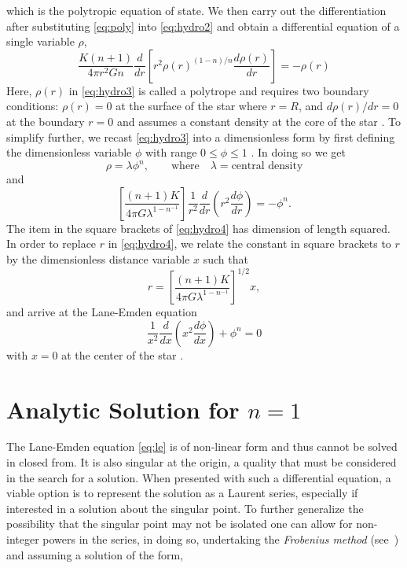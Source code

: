 \documentclass[12pt, manuscript]{article}
\begin{document}
        which is the polytropic equation of state. We then carry out the differentiation after substituting \eqref{eq:poly} into \eqref{eq:hydro2} and obtain a differential equation of a single variable $\rho$,
        \begin{equation}\label{eq:hydro3}
            \frac{K(n+1)}{4\pi r^2Gn}\frac{d}{dr}\left[r^2\rho(r)^{(1-n)/n}\frac{d\rho(r)}{dr}\right] = -\rho(r)
        \end{equation}
        Here, $\rho(r)$ in \eqref{eq:hydro3} is called a polytrope and requires two boundary conditions: $\rho(r) = 0$ at the surface of the star where $r = R$, and $d\rho(r)/dr = 0$ at the boundary $r = 0$ and assumes a constant density at the core of the star \cite{dina}. To simplify further, we recast \eqref{eq:hydro3} into a dimensionless form by first defining the dimensionless variable $\phi$ with range $0 \leq \phi \leq 1$ \cite{lea} \cite{dina}. In doing so we get
        \begin{equation}\label{eq:theta} 
            \rho = \lambda\phi^n, \qquad \text{where} \quad \lambda = \text{central density}
        \end{equation}
         and
        \begin{equation}\label{eq:hydro4}
            \left[\frac{(n+1)K}{4\pi G\lambda^{1-n^{-1}}}\right]\frac{1}{r^2}\frac{d}{dr}\left(r^2\frac{d\phi}{dr}\right) = -\phi^n.
        \end{equation}
        The item in the square brackets of \eqref{eq:hydro4} has dimension of length squared. In order to replace $r$ in \eqref{eq:hydro4}, we relate the constant in square brackets to $r$ by the dimensionless distance variable $x$ such that
        \begin{equation}\label{eq:x}
            r = \left[\frac{(n+1)K}{4\pi G\lambda^{1-n^{-1}}}\right]^{1/2}x,
        \end{equation}
        and arrive at the Lane-Emden equation 
        \begin{equation}\label{eq:le}
            \frac{1}{x^2}\frac{d}{dx}\left(x^2\frac{d\phi}{dx}\right) +\phi^n = 0
        \end{equation}
        with $x = 0$ at the center of the star \cite{lea}.

\section*{Analytic Solution for $n = 1$}
The Lane-Emden equation \eqref{eq:le} is of non-linear form and thus cannot be solved in closed from. It is also singular at the origin, a quality that must be considered in the search for a solution. When presented with such a differential equation, a viable option is to represent the solution as a Laurent series, especially if interested in a solution about the singular point. To further generalize the possibility that the singular point may not be isolated one can allow for non-integer powers in the series, in doing so, undertaking the \emph{Frobenius method} (see~\cite{lea}) and assuming a solution of the form,
\end{document}
